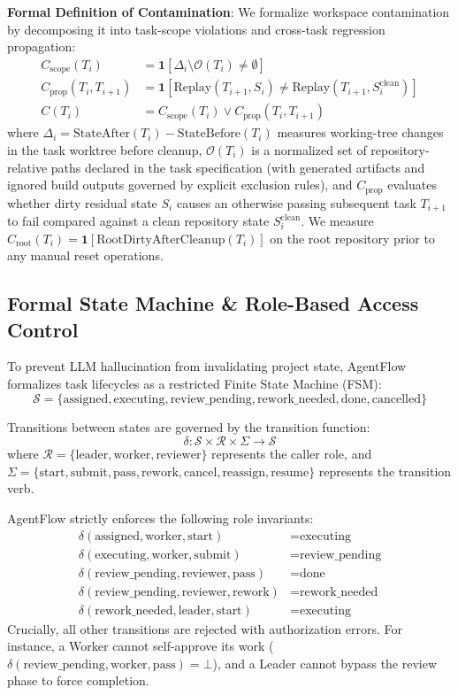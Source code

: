 \documentclass[conference]{IEEEtran}
\begin{document}
\textbf{Formal Definition of Contamination}: We formalize workspace contamination by decomposing it into task-scope violations and cross-task regression propagation:
\begin{align}
C_{\mathrm{scope}}(T_i) &= \mathbf{1}[\Delta_i \setminus \mathcal{O}(T_i) \neq \emptyset] \\
C_{\mathrm{prop}}(T_i, T_{i+1}) &= \mathbf{1}[\mathrm{Replay}(T_{i+1}, S_i) \neq \mathrm{Replay}(T_{i+1}, S_i^{\mathrm{clean}})] \\
C(T_i) &= C_{\mathrm{scope}}(T_i) \lor C_{\mathrm{prop}}(T_i, T_{i+1})
\end{align}
where $\Delta_i = \mathrm{StateAfter}(T_i) - \mathrm{StateBefore}(T_i)$ measures working-tree changes in the task worktree before cleanup, $\mathcal{O}(T_i)$ is a normalized set of repository-relative paths declared in the task specification (with generated artifacts and ignored build outputs governed by explicit exclusion rules), and $C_{\mathrm{prop}}$ evaluates whether dirty residual state $S_i$ causes an otherwise passing subsequent task $T_{i+1}$ to fail compared against a clean repository state $S_i^{\mathrm{clean}}$. We measure $C_{\mathrm{root}}(T_i) = \mathbf{1}[\mathrm{RootDirtyAfterCleanup}(T_i)]$ on the root repository prior to any manual reset operations.

\subsection{Formal State Machine \& Role-Based Access Control}
To prevent LLM hallucination from invalidating project state, AgentFlow formalizes task lifecycles as a restricted Finite State Machine (FSM):
$$\mathcal{S} = \{\text{assigned}, \text{executing}, \text{review\_pending}, \text{rework\_needed}, \text{done}, \text{cancelled}\}$$

Transitions between states are governed by the transition function:
$$\delta: \mathcal{S} \times \mathcal{R} \times \Sigma \to \mathcal{S}$$
where $\mathcal{R} = \{\text{leader}, \text{worker}, \text{reviewer}\}$ represents the caller role, and $\Sigma = \{\text{start}, \text{submit}, \text{pass}, \text{rework}, \text{cancel}, \text{reassign}, \text{resume}\}$ represents the transition verb.

AgentFlow strictly enforces the following role invariants:
\begin{align}
    \delta(\text{assigned}, \text{worker}, \text{start}) &= \text{executing} \\
    \delta(\text{executing}, \text{worker}, \text{submit}) &= \text{review\_pending} \\
    \delta(\text{review\_pending}, \text{reviewer}, \text{pass}) &= \text{done} \\
    \delta(\text{review\_pending}, \text{reviewer}, \text{rework}) &= \text{rework\_needed} \\
    \delta(\text{rework\_needed}, \text{leader}, \text{start}) &= \text{executing}
\end{align}
Crucially, all other transitions are rejected with authorization errors. For instance, a Worker cannot self-approve its work ($\delta(\text{review\_pending}, \text{worker}, \text{pass}) = \bot$), and a Leader cannot bypass the review phase to force completion.
\end{document}
